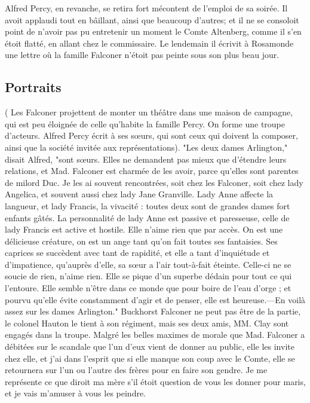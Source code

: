 Alfred Percy, en revanche, se retira fort mécontent de l'emploi de sa soirée. Il avoit applaudi tout en bâillant, ainsi que beaucoup d'autres; et il ne se consoloit point de n'avoir pas pu entretenir un moment le Comte Altenberg, comme il s'en étoit flatté, en allant chez le commissaire. Le lendemain il écrivit à Rosamonde une lettre où la famille Falconer n'étoit pas peinte sous son plus beau jour.
\subsection{Portraits}
( Les Falconer projettent de monter un théâtre dans une maison de campagne, qui est peu éloignée de celle qu'habite la famille Percy. On forme une troupe d'acteurs. Alfred\setcounter{page}{120}  Percy écrit à ses sœurs, qui sont ceux qui doivent la composer, ainsi que la société invitée aux représentations).
"Les deux dames Arlington," disait Alfred, "sont sœurs. Elles ne demandent pas mieux que d'étendre leurs relations, et Mad. Falconer est charmée de les avoir, parce qu'elles sont parentes de milord Duc.
Je les ai souvent rencontrées, soit chez les Falconer, soit chez lady Angelica, et souvent aussi chez lady Jane Granville. Lady Anne affecte la langueur, et lady Francis, la vivacité : toutes deux sont de grandes dames fort enfants gâtés. La personnalité de lady Anne est passive et paresseuse, celle de lady Francis est active et hostile. Elle n'aime rien que par accès. On est une délicieuse créature, on est un ange tant qu'on fait toutes ses fantaisies. Ses caprices se succèdent avec tant de rapidité, et elle a tant d'inquiétude et d'impatience, qu'auprès d'elle, sa sœur a l'air tout-à-fait éteinte. Celle-ci ne se soucie de rien, n'aime rien. Elle se pique d'un superbe dédain pour tout ce qui l'entoure. Elle semble n'être dans ce monde que pour boire de l'eau d'orge ; et pourvu qu'elle évite constamment d'agir et de penser, elle est heureuse.—En voilà assez sur les dames Arlington."\setcounter{page}{121} Buckhorst Falconer ne peut pas être de la partie, le colonel Hauton le tient à son régiment, mais ses deux amis, MM. Clay sont engagés dans la troupe. Malgré les belles maximes de morale que Mad. Falconer a débitées sur le scandale que l'un d'eux vient de donner au public, elle les invite chez elle, et j'ai dans l'esprit que si elle manque son coup avec le Comte, elle se retournera sur l'un ou l'autre des frères pour en faire son gendre. Je me représente ce que diroit ma mère s'il étoit question de vous les donner pour maris, et je vais m'amuser à vous les peindre.
